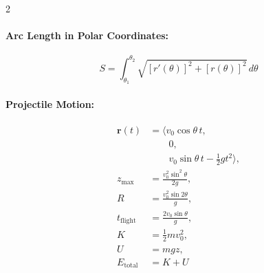 \begin{multicols}{2}
\paragraph{Arc Length in Polar Coordinates:}
\[
S = \int_{\theta_1}^{\theta_2} \sqrt{[r'(\theta)]^2 + [r(\theta)]^2} \, d\theta
\]

\paragraph{Projectile Motion:}
\begin{align*}
\mathbf{r}(t) &= \langle v_0 \cos\theta \, t, \\
&\qquad 0, \\
&\qquad v_0 \sin\theta \, t - \tfrac{1}{2} g t^2 \rangle, \\
z_{\text{max}} &= \frac{v_0^2 \sin^2\theta}{2g}, \\
R &= \frac{v_0^2 \sin 2\theta}{g}, \\
t_{\text{flight}} &= \frac{2 v_0 \sin\theta}{g}, \\
K &= \frac{1}{2} m v_0^2, \\
U &= m g z, \\
E_{\text{total}} &= K + U
\end{align*}

\end{multicols}




\newpage


\practice{}

